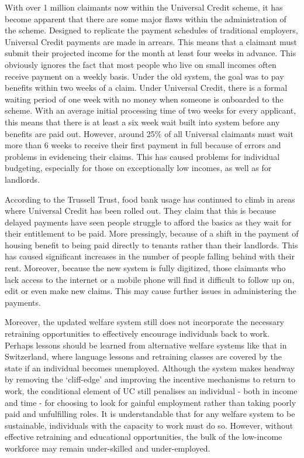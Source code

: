 \documentclass[]{tufte-handout}
\begin{document}
With over 1 million claimants now within the Universal Credit scheme, it
has become apparent that there are some major flaws within the
administration of the scheme. Designed to replicate the payment
schedules of traditional employers, Universal Credit payments are made
in arrears. This means that a claimant must submit their projected
income for the month at least four weeks in advance. This obviously
ignores the fact that most people who live on small incomes often
receive payment on a weekly basis. Under the old system, the goal was to
pay benefits within two weeks of a claim. Under Universal Credit, there
is a formal waiting period of one week with no money when someone is
onboarded to the scheme. With an average initial processing time of two
weeks for every applicant, this means that there is at least a six week
wait built into system before any benefits are paid out. However, around
25\% of all Universal claimants must wait more than 6 weeks to receive
their first payment in full because of errors and problems in evidencing
their claims. This has caused problems for individual budgeting,
especially for those on exceptionally low incomes, as well as for
landlords.

According to the Trussell Trust, food bank usage has continued to climb
in areas where Universal Credit has been rolled out. They claim that
this is because delayed payments have seen people struggle to afford the
basics as they wait for their entitlement to be paid. More pressingly,
because of a shift in the payment of housing benefit to being paid
directly to tenants rather than their landlords. This has caused
significant increases in the number of people falling behind with their
rent. Moreover, because the new system is fully digitized, those
claimants who lack access to the internet or a mobile phone will find it
difficult to follow up on, edit or even make new claims. This may cause
further issues in administering the payments.

Moreover, the updated welfare system still does not incorporate the
necessary retraining opportunities to effectively encourage individuals
back to work. Perhaps lessons should be learned from alternative welfare
systems like that in Switzerland, where language lessons and retraining
classes are covered by the state if an individual becomes unemployed.
Although the system makes headway by removing the `cliff-edge' and
improving the incentive mechanisms to return to work, the conditional
element of UC still penalises an individual - both in income and time -
for choosing to look for gainful employment rather than taking poorly
paid and unfulfilling roles. It is understandable that for any welfare
system to be sustainable, individuals with the capacity to work must do
so. However, without effective retraining and educational opportunities,
the bulk of the low-income workforce may remain under-skilled and
under-employed.
\end{document}
